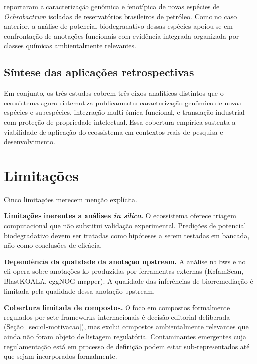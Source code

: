 \citet{freitas2025ochrobactrum} reportaram a caracterização genômica e fenotípica de novas espécies de \textit{Ochrobactrum} isoladas de reservatórios brasileiros de petróleo. Como no caso anterior, a análise de potencial biodegradativo dessas espécies apoiou-se em confrontação de anotações funcionais com evidência integrada organizada por classes químicas ambientalmente relevantes.

\subsection{Síntese das aplicações retrospectivas}

Em conjunto, os três estudos cobrem três eixos analíticos distintos que o ecossistema \biorempp{} agora sistematiza publicamente: caracterização genômica de novas espécies e subespécies, integração multi-ômica funcional, e translação industrial com proteção de propriedade intelectual. Essa cobertura empírica sustenta a viabilidade de aplicação do ecossistema em contextos reais de pesquisa e desenvolvimento.

\section{Limitações}
\label{sec:c7-limitacoes}

Cinco limitações merecem menção explícita.

\textbf{Limitações inerentes a análises \textit{in silico}.} O ecossistema oferece triagem computacional que não substitui validação experimental. Predições de potencial biodegradativo devem ser tratadas como hipóteses a serem testadas em bancada, não como conclusões de eficácia.

\textbf{Dependência da qualidade da anotação upstream.} A análise no \gls{bws} e no \gls{cli} opera sobre anotações \gls{ko} produzidas por ferramentas externas (KofamScan, BlastKOALA, eggNOG-mapper). A qualidade das inferências de biorremediação é limitada pela qualidade dessa anotação upstream.

\textbf{Cobertura limitada de compostos.} O foco em compostos formalmente regulados por sete frameworks internacionais é decisão editorial deliberada (Seção~\ref{sec:c1-motivacao}), mas exclui compostos ambientalmente relevantes que ainda não foram objeto de listagem regulatória. Contaminantes emergentes cuja regulamentação está em processo de definição podem estar sub-representados até que sejam incorporados formalmente.

